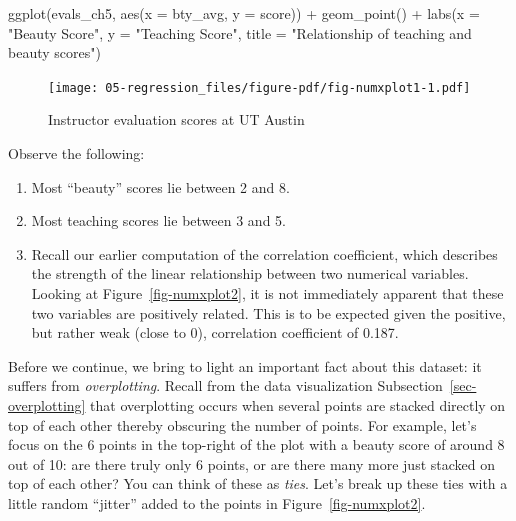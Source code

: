 \documentclass[
  letterpaper,
  DIV=11,
  numbers=noendperiod]{scrreprt}
\newenvironment{Shaded}{\begin{snugshade}}{\end{snugshade}}
\newcommand{\AttributeTok}[1]{\textcolor[rgb]{0.40,0.45,0.13}{#1}}
\newcommand{\FunctionTok}[1]{\textcolor[rgb]{0.28,0.35,0.67}{#1}}
\newcommand{\NormalTok}[1]{\textcolor[rgb]{0.00,0.23,0.31}{#1}}
\newcommand{\SpecialCharTok}[1]{\textcolor[rgb]{0.37,0.37,0.37}{#1}}
\newcommand{\StringTok}[1]{\textcolor[rgb]{0.13,0.47,0.30}{#1}}
\theoremstyle{definition}
\theoremstyle{remark}
\begin{document}
\begin{Shaded}
\begin{Highlighting}[]
\FunctionTok{ggplot}\NormalTok{(evals\_ch5, }\FunctionTok{aes}\NormalTok{(}\AttributeTok{x =}\NormalTok{ bty\_avg, }\AttributeTok{y =}\NormalTok{ score)) }\SpecialCharTok{+}
  \FunctionTok{geom\_point}\NormalTok{() }\SpecialCharTok{+}
  \FunctionTok{labs}\NormalTok{(}\AttributeTok{x =} \StringTok{"Beauty Score"}\NormalTok{, }\AttributeTok{y =} \StringTok{"Teaching Score"}\NormalTok{, }
       \AttributeTok{title =} \StringTok{"Relationship of teaching and beauty scores"}\NormalTok{)}
\end{Highlighting}
\end{Shaded}

\begin{figure}[H]

{\centering \texttt{[image: 05-regression\_files/figure-pdf/fig-numxplot1-1.pdf]}

}

\caption{\label{fig-numxplot1}Instructor evaluation scores at UT Austin}

\end{figure}

Observe the following:

\begin{enumerate}
\def\labelenumi{\arabic{enumi}.}
\item
  Most ``beauty'' scores lie between 2 and 8.
\item
  Most teaching scores lie between 3 and 5.
\item
  Recall our earlier computation of the correlation coefficient, which
  describes the strength of the linear relationship between two
  numerical variables. Looking at Figure~\ref{fig-numxplot2}, it is not
  immediately apparent that these two variables are positively related.
  This is to be expected given the positive, but rather weak (close to
  0), correlation coefficient of 0.187.
\end{enumerate}

Before we continue, we bring to light an important fact about this
dataset: it suffers from \emph{overplotting}. Recall from the data
visualization Subsection~\ref{sec-overplotting} that overplotting occurs
when several points are stacked directly on top of each other thereby
obscuring the number of points. For example, let's focus on the 6 points
in the top-right of the plot with a beauty score of around 8 out of 10:
are there truly only 6 points, or are there many more just stacked on
top of each other? You can think of these as \emph{ties}. Let's break up
these ties with a little random ``jitter'' added to the points in
Figure~\ref{fig-numxplot2}.
\end{document}

